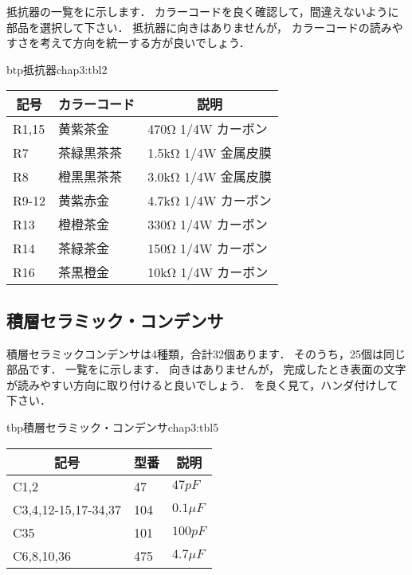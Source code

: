 抵抗器の一覧をに示します．
カラーコードを良く確認して，間違えないように部品を選択して下さい．
抵抗器に向きはありませんが，
カラーコードの読みやすさを考えて方向を統一する方が良いでしょう．


\begin{mytable}{btp}{抵抗器}{chap3:tbl2}
  {\small\begin{tabular}{l|l|l}
    \hline
    \hline
    \multicolumn{1}{c|}{記号} &
    \multicolumn{1}{c|}{カラーコード} &
    \multicolumn{1}{c}{説明} \\
    \hline
    R1,15 & 黄紫茶金   & 470Ω  1/4W カーボン \\
    R7    & 茶緑黒茶茶 & 1.5kΩ 1/4W 金属皮膜 \\
    R8    & 橙黒黒茶茶 & 3.0kΩ 1/4W 金属皮膜 \\
    R9-12 & 黄紫赤金   & 4.7kΩ 1/4W カーボン \\
    R13   & 橙橙茶金   & 330Ω  1/4W カーボン \\
    R14   & 茶緑茶金   & 150Ω  1/4W カーボン \\
    R16   & 茶黒橙金   & 10kΩ  1/4W カーボン \\
  \end{tabular}}
\end{mytable}

\subsection{積層セラミック・コンデンサ}
積層セラミックコンデンサは4種類，合計32個あります．
そのうち，25個は同じ部品です．
一覧をに示します．
向きはありませんが，
完成したとき表面の文字が読みやすい方向に取り付けると良いでしょう．
を良く見て，ハンダ付けして下さい．

\begin{mytable}{tbp}{積層セラミック・コンデンサ}{chap3:tbl5}
  {\small\begin{tabular}{l|l|l}
    \hline
    \hline
    \multicolumn{1}{c|}{記号} &
    \multicolumn{1}{c|}{型番} &
    \multicolumn{1}{c}{説明} \\
    \hline
    C1,2                &  47 & $  47 pF $    \\
    C3,4,12-15,17-34,37 & 104 & $ 0.1 \mu F $ \\
    C35                 & 101 & $ 100 pF $    \\
    C6,8,10,36          & 475 & $ 4.7 \mu F $ \\
  \end{tabular}}
\end{mytable}

